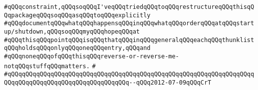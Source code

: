 \verb|#qQQqconstraint,qQQqsoqQQqI'veqQQqtriedqQQqtoqQQqrestructureqQQqthisqQQqpackageqQQqsoqQQqasqQQqtoqQQqexplicitly|\newline
\verb|#qQQqdocumentqQQqwhatqQQqhappensqQQqinqQQqwhatqQQqorderqQQqatqQQqstartup/shutdown,qQQqsoqQQqmyqQQqhopeqQQqat|\newline
\verb|#qQQqthisqQQqpointqQQqisqQQqthatqQQqinqQQqgeneralqQQqeachqQQqthunklistqQQqholdsqQQqonlyqQQqoneqQQqentry,qQQqand|\newline
\verb|#qQQqnoneqQQqofqQQqthisqQQqreverse-or-reverse-me-notqQQqstuffqQQqmatters.|\newline
\verb|#|\newline
\verb|#qQQqqQQqqQQqqQQqqQQqqQQqqQQqqQQqqQQqqQQqqQQqqQQqqQQqqQQqqQQqqQQqqQQqqQQqqQQqqQQqqQQqqQQqqQQqqQQqqQQqqQQq--qQQq2012-07-09qQQqCrT|\newline
\newline
\newline

